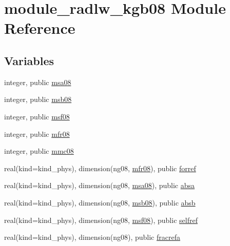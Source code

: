 \hypertarget{namespacemodule__radlw__kgb08}{}\section{module\+\_\+radlw\+\_\+kgb08 Module Reference}
\label{namespacemodule__radlw__kgb08}
\subsection*{Variables}
\begin{DoxyCompactItemize}
\item 
integer, public \hyperlink{namespacemodule__radlw__kgb08_a74e4bd8f4b00d0ff6bae1a39d9bddd3b}{msa08}
\item 
integer, public \hyperlink{group__module__radlw__main_ga3dd391fcce47d3aca3512bbfd946807b}{msb08}
\item 
integer, public \hyperlink{group__module__radlw__main_ga7db22d5a0ece1b1f10cbf64ae1181a09}{msf08}
\item 
integer, public \hyperlink{group__module__radlw__main_gabfaf0cad62f8ae42564f8127198d48f0}{mfr08}
\item 
integer, public \hyperlink{group__module__radlw__main_ga9e3bfc1880221c18fa07817eb62bcc47}{mmc08}
\item 
real(kind=kind\+\_\+phys), dimension(ng08, \hyperlink{group__module__radlw__main_gabfaf0cad62f8ae42564f8127198d48f0}{mfr08}), public \hyperlink{group__module__radlw__main_ga8427ec5170f6a61a008a8580be6fe5ec}{forref}
\item 
real(kind=kind\+\_\+phys), dimension(ng08, \hyperlink{namespacemodule__radlw__kgb08_a74e4bd8f4b00d0ff6bae1a39d9bddd3b}{msa08}), public \hyperlink{group__module__radlw__main_gaba1018958264bbc6fbf7f190fea91fa5}{absa}
\item 
real(kind=kind\+\_\+phys), dimension(ng08, \hyperlink{group__module__radlw__main_ga3dd391fcce47d3aca3512bbfd946807b}{msb08}), public \hyperlink{group__module__radlw__main_ga23d4352fcafb0394d723e2f080a84ece}{absb}
\item 
real(kind=kind\+\_\+phys), dimension(ng08, \hyperlink{group__module__radlw__main_ga7db22d5a0ece1b1f10cbf64ae1181a09}{msf08}), public \hyperlink{group__module__radlw__main_ga2c38561d26f86f7ae515b433843c4e5d}{selfref}
\item 
real(kind=kind\+\_\+phys), dimension(ng08), public \hyperlink{group__module__radlw__main_gad1a59ffb362cd72537df9c1916c07621}{fracrefa}
\item 

\end{DoxyCompactItemize}
